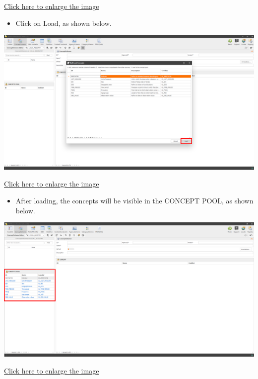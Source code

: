 \documentclass[
]{book}
\providecommand{\tightlist}{%
  \setlength{\itemsep}{0pt}\setlength{\parskip}{0pt}}
\begin{document}
\href{images/image108.png}{Click here to enlarge the image}

\begin{itemize}
\tightlist
\item
  Click on Load, as shown below.
\end{itemize}

\begin{center}\includegraphics[width=1\linewidth]{./images/image110} \end{center}

\href{images/image110.png}{Click here to enlarge the image}

\begin{itemize}
\tightlist
\item
  After loading, the concepts will be visible in the CONCEPT POOL, as shown below.
\end{itemize}

\begin{center}\includegraphics[width=1\linewidth]{./images/image279} \end{center}

\href{images/image279.png}{Click here to enlarge the image}
\end{document}
